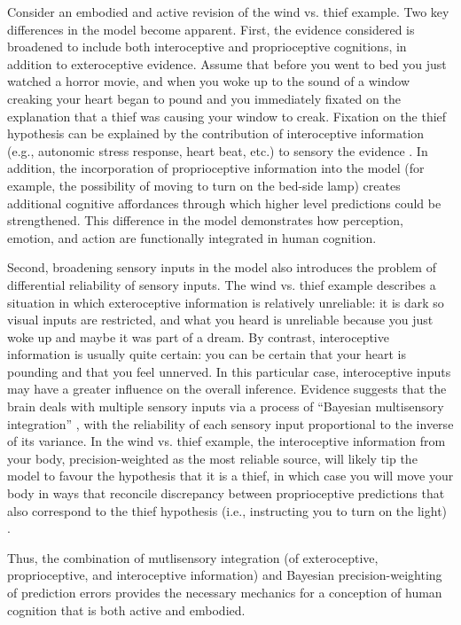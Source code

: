 \begin{CJK}{UTF8}{gbsn}
Consider an embodied and active revision of the wind vs. thief example.  Two key differences in the model become apparent.  First, the evidence considered is broadened to include both interoceptive and proprioceptive cognitions, in addition to exteroceptive evidence.  Assume that before you went to bed you just watched a horror movie, and when you woke up to the sound of a window creaking your heart began to pound and you immediately fixated on the explanation that a thief was causing your window to creak.  Fixation on the thief hypothesis can be explained by the contribution of interoceptive information (e.g., autonomic stress response, heart beat, etc.) to sensory the evidence \citep{Pezzulo2014}.  In addition, the incorporation of proprioceptive information into the model (for example, the possibility of moving to turn on the bed-side lamp) creates additional cognitive affordances through which higher level predictions could be strengthened.  This difference in the model demonstrates how perception, emotion, and action are functionally integrated in human cognition.

Second, broadening sensory inputs in the model also introduces the problem of differential reliability of sensory inputs.  The wind vs. thief example describes a situation in which exteroceptive information is relatively unreliable: it is dark so visual inputs are restricted, and what you heard is unreliable because you just woke up and maybe it was part of a dream.  By contrast, interoceptive information is usually quite certain: you can be certain that your heart is pounding and that you feel unnerved.  In this particular case, interoceptive inputs may have a greater influence on the overall inference.  Evidence suggests that the brain deals with multiple sensory inputs via a process of ``Bayesian multisensory integration'' \citep{Ernst2004}, with the reliability of each sensory input proportional to the inverse of its variance.  In the wind vs. thief example, the interoceptive information from your body, precision-weighted as the most reliable source, will likely tip the model to favour the hypothesis that it is a thief, in which case you will move your body in ways that reconcile discrepancy between proprioceptive predictions that also correspond to the thief hypothesis (i.e., instructing you to turn on the light) \citep{Pezzulo2014}.

Thus, the combination of mutlisensory integration (of exteroceptive, proprioceptive, and interoceptive information) and Bayesian precision-weighting of prediction errors provides the necessary mechanics for a conception of human cognition that is both active and embodied.


\end{CJK}

